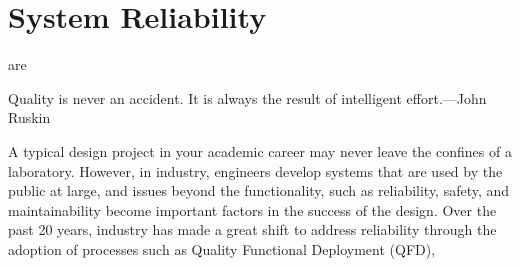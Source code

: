 \chapter{System Reliability}are 
\label{chapter:systemReliability}
\graphicspath{ {./chapter08/Fig} }

\begin{itquote}
Quality is never an accident. It is always the result of intelligent
effort.---John Ruskin
\end{itquote}


A typical design project in your academic career may never leave the
confines of a laboratory. However, in industry, engineers develop
systems that are used by the public at large, and issues beyond the
functionality, such as reliability, safety, and maintainability become
important factors in the success of the design. Over the past 20 years,
industry has made a great shift to address reliability through the
adoption of processes such as Quality Functional Deployment (QFD),

